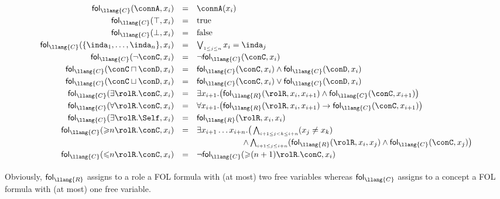\documentclass[10pt,a4paper]{amsart}
\theoremstyle{definition}
\numberwithin{equation}{section}
\theoremstyle{plain}
\theoremstyle{definition}
\theoremstyle{myexample}
\theoremstyle{plain}
\theoremstyle{definition}
\newcommand{\fcn}[1]{\mathsf{#1}}
\begin{document}
\[
\begin{array}{rll}
	 \fcn{fol}_{ \llang{C}}(\connA,x_i) & = & \connA(x_i)\\[1mm]
	 \fcn{fol}_{ \llang{C}}(\top,x_i) & = & \mathrm{true}\\[1mm]
	 \fcn{fol}_{ \llang{C}}(\bot,x_i) & = & \mathrm{false}\\[1mm]
	 \fcn{fol}_{ \llang{C}}(\{\inda_1,\ldots,\inda_n\},x_i) & = &\bigvee_{\scriptscriptstyle 1\leq j\leq n} x_i=\inda_j\\[1mm]
	 \fcn{fol}_{ \llang{C}}(\neg\conC,x_i) & = & \neg \fcn{fol}_{ \llang{C}}(\conC,x_i)\\[1mm]
	 \fcn{fol}_{ \llang{C}}(\conC\sqcap\conD,x_i) & = &  \fcn{fol}_{ \llang{C}}(\conC,x_i)\wedge  \fcn{fol}_{ \llang{C}}(\conD,x_i)\\[1mm]
	 \fcn{fol}_{ \llang{C}}(\conC\sqcup\conD,x_i) & = &  \fcn{fol}_{ \llang{C}}(\conC,x_i)\vee  \fcn{fol}_{ \llang{C}}(\conD,x_i)\\[1mm]
	 \fcn{fol}_{ \llang{C}}(\exists\rolR.\conC,x_i) & = & \exists x_{i+1}.\big( \fcn{fol}_{ \llang{R}}(\rolR,x_i,x_{i+1})\wedge  \fcn{fol}_{ \llang{C}}(\conC,x_{i+1})\big)\\[1mm]
	 \fcn{fol}_{ \llang{C}}(\forall\rolR.\conC,x_i) & = & \forall x_{i+1}.\big( \fcn{fol}_{ \llang{R}}(\rolR,x_i,x_{i+1}) \to  \fcn{fol}_{ \llang{C}}(\conC,x_{i+1})\big)\\[1mm]
	 \fcn{fol}_{ \llang{C}}(\exists\rolR.\Self,x_i) & = &  \fcn{fol}_{ \llang{R}}(\rolR,x_i,x_i)\\[1mm]
	 \fcn{fol}_{ \llang{C}}(\mathord{\geqslant}n \rolR.\conC,x_i) & = & \exists x_{i+1}\dots x_{i+n}.\big(\bigwedge_{\scriptscriptstyle i+1\leq j < k \leq i+n}(x_j\not=x_k)\\[1mm]
	& & \hspace{20mm}\wedge\bigwedge_{\scriptscriptstyle i+1\leq j\leq i+n}( \fcn{fol}_{ \llang{R}}(\rolR,x_i,x_j)\wedge  \fcn{fol}_{ \llang{C}}(\conC,x_{j})\big)\\[1mm]
	 \fcn{fol}_{ \llang{C}}(\mathord{\leqslant}n \rolR.\conC,x_i) & = & \neg \fcn{fol}_{ \llang{C}}(\mathord{\geqslant}{(n+1)} \rolR.\conC,x_i)\\[1mm]
\end{array}
\]

Obviously, $\fcn{fol}_ \llang{R}$ assigns to a role a FOL formula with (at most) two free variables whereas $ \fcn{fol}_ \llang{C}$ assigns to a concept a FOL formula with (at most) one free variable. 
\end{document}

